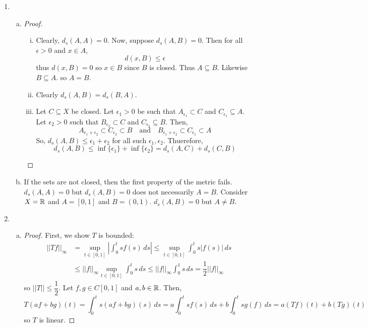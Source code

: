 \begin{enumerate}
\item 
	\begin{enumerate}[(a)]
	\item \begin{proof}
		\begin{enumerate}[(i)]
			\item Clearly, $d_s(A,A)=0$. Now, suppose $d_s(A,B)=0$. Then for all $\epsilon >0$ and $x \in A$,
				\[ d(x,B) \le \epsilon \]
			thus $d(x,B)=0$ so $x \in B$ since $B$ is closed. Thus $A \subseteq B$. Likewise $B \subseteq A$. so $A=B$.
			\item Clearly $d_s(A,B) = d_s(B,A)$.
			\item Let $C \subseteq X$ be closed. Let $\epsilon_1>0$ be such that $A_{\epsilon_1} \subset C$ and $C_{\epsilon_1} \subseteq A$. Let $\epsilon_2>0$ such that $B_{\epsilon_2} \subset C$ and $C_{\epsilon_2} \subseteq B$. Then,
				\[ A_{\epsilon_1+\epsilon_2} \subset C_{\epsilon_2} \subset B \quad \text{and} \quad B_{\epsilon_1+\epsilon_2} \subset C_{\epsilon_1} \subset A \]
			So, $d_s(A,B) \le \epsilon_1+\epsilon_2$ for all such $\epsilon_1,\epsilon_2$. Thuerefore,
				\[ d_s(A,B) \le \inf\{\epsilon_1\} + \inf\{\epsilon_2\} = d_s(A,C) + d_s(C,B) \]
		\end{enumerate}
	\end{proof}

	\item If the sets are not closed, then the first property of the metric fails. $d_s(A,A)=0$ but $d_s(A,B)=0$ does not necessarily $A=B$. Consider $X=\mathbb{R}$ and $A=[0,1]$ and $B=(0,1)$. $d_s(A,B)=0$ but $A \ne B$.
	\end{enumerate}

\item \begin{enumerate}[(a)]
	\item \begin{proof}
		First, we show $T$ is bounded:
		\begin{align*}
		||Tf||_\infty &= \sup_{t \in [0,1]} \left| \int_0^t sf(s) \, ds \right| \le \sup_{t \in [0,1]} \int_0^t s|f(s)| \, ds \\
			&\le ||f||_\infty \sup_{t \in [0,1]} \int_0^t s \, ds \le ||f||_\infty \int_0^1 s \, ds = \dfrac 12 ||f||_\infty
		\end{align*}
		so $||T|| \le \dfrac 12$. 
		Let $f,g \in C[0,1]$ and $a,b \in \mathbb{R}$. Then,
		\[ T(af+bg)(t) = \int_0^t s(af+bg)(s) \, ds = a \int_0^t sf(s) \, ds + b \int_0^t sg(f) \, ds = a(Tf)(t) + b(Tg)(t) \]
		so $T$ is linear.
	\end{proof}
	

\end{enumerate}
\end{enumerate}
